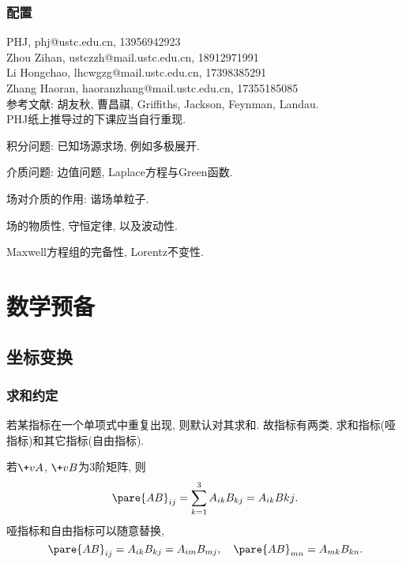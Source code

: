 \documentclass[hidelinks]{ctexart}
\begin{document}
\subsubsection*{配置} %
\label{ssub:配置}

\noindent
PHJ, phj@ustc.edu.cn, 13956942923\\
Zhou Zihan, ustczzh@mail.ustc.edu.cn, 18912971991\\
Li Hongchao, lhcwgzg@mail.ustc.edu.cn, 17398385291\\
Zhang Haoran, haoranzhang@mail.ustc.edu.cn, 17355185085\\
参考文献: 胡友秋, 曹昌祺, Griffiths, Jackson, Feynman, Landau.\\
PHJ纸上推导过的下课应当自行重现. \\
\begin{cenum}
    \item 积分问题: 已知场源求场, 例如多极展开.
    \item 介质问题: 边值问题, Laplace方程与Green函数.
    \item 场对介质的作用: 谐场单粒子.
    \item 场的物质性, 守恒定律, 以及波动性.
    \item Maxwell方程组的完备性, Lorentz不变性.
\end{cenum}


\section{数学预备} %
\label{sec:数学预备}

\subsection{坐标变换} %
\label{sub:坐标变换}

\subsubsection{求和约定} %
\label{ssub:求和约定}

若某指标在一个单项式中重复出现, 则默认对其求和. 故指标有两类, 求和指标(哑指标)和其它指标(自由指标).
\begin{ex}
    若$\+vA$, $\+vB$为$3$阶矩阵, 则
    \[ \pare{AB}_{ij} = \sum_{k=1}^3 A_{ik}B_{kj} = A_{ik}B{kj}. \]
    哑指标和自由指标可以随意替换,
    \[ \pare{AB}_{ij} = A_{ik}B_{kj} = A_{im}B_{mj},\quad \pare{AB}_{mn} = A_{mk}B_{kn}. \]
\end{ex}
\end{document}
